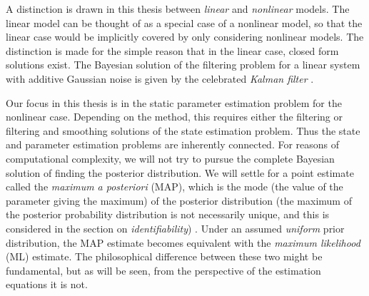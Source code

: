 A distinction is drawn in this thesis between \emph{linear} and \emph{nonlinear}
models. The linear model can be thought of as a special case of a nonlinear model,
so that the linear case would be implicitly covered by only considering nonlinear models.
The distinction is made for the simple reason that in the linear case, closed
form solutions exist. The Bayesian solution of the filtering problem for a linear system
with additive Gaussian noise is given by the celebrated \emph{Kalman filter} \parencite{Kalman1960}.

Our focus in this thesis is in the static parameter estimation problem for the nonlinear case.
Depending on the method, this requires either the filtering or filtering and smoothing
solutions of the state estimation problem. Thus the state and parameter estimation problems
are inherently connected. For reasons of computational
complexity, we will not try to pursue the complete Bayesian solution of finding the 
posterior distribution. We will settle for a point estimate called the 
\emph{maximum a posteriori} (MAP), which is the mode (the value of the parameter giving the maximum) 
of the posterior distribution (the maximum of the posterior probability distribution is
not necessarily unique, and this is considered in the section on \emph{identifiability}) \parencite{gelman2004}.
Under an assumed \emph{uniform} prior distribution, the MAP estimate becomes equivalent 
with the \emph{maximum likelihood} (ML) estimate. The philosophical difference between these 
two might be fundamental, but as will be seen, from the perspective of the estimation equations it is not.

